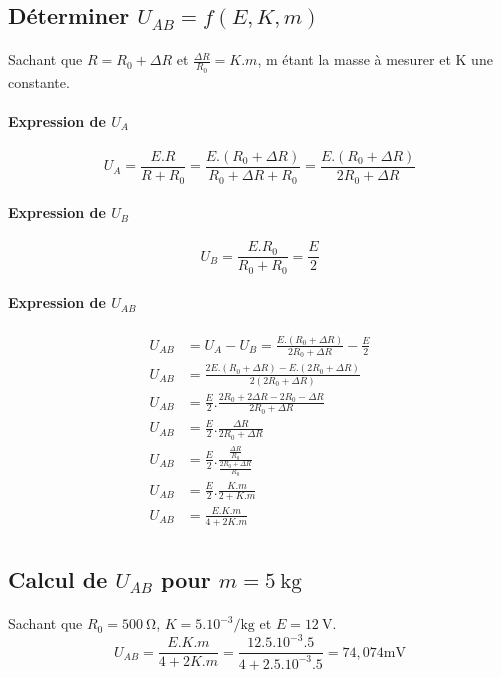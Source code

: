 \documentclass{article}
\begin{document}
\subsection{Déterminer $U_{AB} = f\left(E, K, m\right)$}
\paragraph{}
Sachant que $R = R_0 + \Delta R$ et $\frac{\Delta R}{R_0} = K.m$, m étant la masse à mesurer et K une constante.
\paragraph{Expression de $U_A$}
$$U_A = \frac{E.R}{R + R_0} = \frac{E.(R_0 + \Delta R)}{R_0 + \Delta R + R_0} = \frac{E.(R_0 + \Delta R)}{2R_0 + \Delta R}$$

\paragraph{Expression de $U_B$}
$$U_B = \frac{E.R_0}{R_0 + R_0} = \frac{E}{2}$$

\paragraph{Expression de $U_{AB}$}
\begin{align*}
    U_{AB} & = U_A - U_B = \frac{E.(R_0 + \Delta R)}{2R_0 + \Delta R} - \frac{E}{2}\\
    U_{AB} & = \frac{2E.(R_0 + \Delta R)-E.(2R_0 + \Delta R)}{2(2R_0 + \Delta R)}\\
    U_{AB} & = \frac{E}{2}.\frac{2R_0 + 2\Delta R - 2R_0 - \Delta R}{2R_0 + \Delta R}\\
    U_{AB} & = \frac{E}{2}.\frac{\Delta R}{2R_0 + \Delta R}\\
    U_{AB} & = \frac{E}{2}.\frac{\frac{\Delta R}{R_0}}{\frac{2R_0 + \Delta R}{R_0}}\\
    U_{AB} & = \frac{E}{2}.\frac{K.m}{2 + K.m}\\
    U_{AB} & = \frac{E.K.m}{4 + 2K.m}\\
\end{align*}

\subsection{Calcul de $U_{AB}$ pour $m = \SI{5}{\kilogram}$}
\paragraph{}
Sachant que $R_0 = \SI{500}{\ohm}$, $K = 5.10^{-3} \si{\per\kilogram}$ et $E = \SI{12}{\volt}$.
$$U_{AB} = \frac{E.K.m}{4 + 2K.m} = \frac{12.5.10^{-3}.5}{4 + 2.5.10^{-3}.5} = 74,074 \si{\milli\volt}$$
\end{document}
